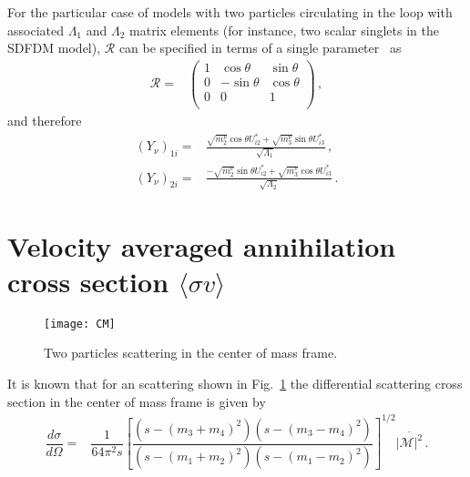 For the particular case of models with two particles circulating in the loop with associated $\Lambda_1$ and $\Lambda_2$ matrix elements (for instance, two scalar singlets in the SDFDM model), $\boldsymbol{\mathcal{R}}$ can be specified in terms of a single parameter~\cite{Casas:2001sr,Ibarra:2003up} as
\begin{align}
  \boldsymbol{\mathcal{R}}=&
  \begin{pmatrix}
    1 & \cos\theta & \sin\theta\\
    0 & -\sin\theta & \cos\theta\\
    0 &   0        & 1         \\ 
  \end{pmatrix} \,,
\end{align}
and therefore
\begin{align}
(Y_{\nu})_{1 i}=&\frac{\sqrt{m^\nu_2}\cos\theta U^{*}_{i2}+ \sqrt{m^\nu_3}\sin\theta U^{*}_{i3}}%
{\sqrt{\Lambda_1}}\,,\nonumber\\
(Y_{\nu})_{2 i}=&\frac{-\sqrt{m^\nu_2}\sin\theta U^{*}_{i2}+ \sqrt{m^\nu_3}\cos\theta U^{*}_{i3}}%
{\sqrt{\Lambda_2}}\,.
\end{align}












\section{Velocity averaged annihilation cross section $\langle \sigma v \rangle$ }
\label{sec:sigmav}
%
\begin{figure}[h]
\begin{center}
\texttt{[image: CM]}
\end{center}
\caption{Two particles scattering in the center of mass frame.}
\label{fig:cm-frame}
\end{figure}
%
It is known that for an scattering shown in Fig.~\ref{fig:cm-frame} the differential scattering cross section in the center of mass frame is given by
%
\begin{align}
\dfrac{d\sigma}{d\Omega}=&\dfrac{1}{64\pi^2s}\left[\dfrac{\left(s-(m_3+m_4)^2\right)\left(s-(m_3-m_4)^2\right)}{\left(s-(m_1+m_2)^2\right)\left(s-(m_1-m_2)^2\right)}\right]^{1/2}\overline{{|\mathcal{M}|^2}}\,.
\end{align}
%

